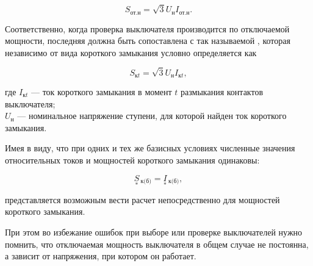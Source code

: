 \begin{equation*}
	S_{\text{от.н}} = \sqrt{3}U_{\text{н}}I_{\text{от.н}}.
\end{equation*}

Соответственно, когда проверка выключателя производится по отключаемой мощности, последняя должна быть сопоставлена с так называемой , которая независимо от вида короткого замыкания условно определяется как

\begin{equation} %
	\label{eq:2-38 S_kz_v_moment_t}
	S_{\text{к}t} = \sqrt{3}U_{\text{н}}I_{\text{к}t},
\end{equation}

где $ I_{\text{к}t} $ --- ток короткого замыкания в момент $ t $ размыкания контактов выключателя; \\
$ U_{\text{н}} $ --- номинальное напряжение ступени, для которой найден ток короткого замыкания.

Имея в виду, что при одних и тех же базисных условиях численные значения относительных токов и мощностей короткого замыкания одинаковы:

\begin{equation} %
	\label{eq:2-39 S_kz_baz_from_I_kz}
	\underset{*}{S}\!\,_{\text{к(б)}} = \underset{*}{I}\!\,_{\text{к(б)}},
\end{equation}

представляется возможным вести расчет непосредственно для мощностей короткого замыкания.

При этом во избежание ошибок при выборе или проверке выключателей нужно помнить, что отключаемая мощность выключателя в общем случае не постоянна, а зависит от напряжения, при котором он работает.


